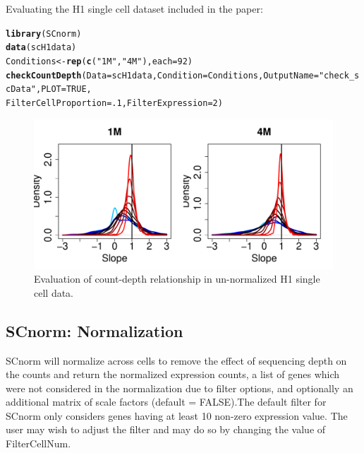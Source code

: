\documentclass{article}\usepackage[]{graphicx}\usepackage[usenames,dvipsnames]{color}
\makeatletter
\newcommand{\hlnum}[1]{\textcolor[rgb]{0.686,0.059,0.569}{#1}}%
\newcommand{\hlstr}[1]{\textcolor[rgb]{0.192,0.494,0.8}{#1}}%
\newcommand{\hlstd}[1]{\textcolor[rgb]{0.345,0.345,0.345}{#1}}%
\newcommand{\hlkwb}[1]{\textcolor[rgb]{0.69,0.353,0.396}{#1}}%
\newcommand{\hlkwc}[1]{\textcolor[rgb]{0.333,0.667,0.333}{#1}}%
\newcommand{\hlkwd}[1]{\textcolor[rgb]{0.737,0.353,0.396}{\textbf{#1}}}%
\newenvironment{kframe}{%
 \def\at@end@of@kframe{}%
 \ifinner\ifhmode%
  \def\at@end@of@kframe{\end{minipage}}%
  \begin{minipage}{\columnwidth}%
 \fi\fi%
 \def\FrameCommand##1{\hskip\@totalleftmargin \hskip-\fboxsep
 \colorbox{shadecolor}{##1}\hskip-\fboxsep
     \hskip-\linewidth \hskip-\@totalleftmargin \hskip\columnwidth}%
 \MakeFramed {\advance\hsize-\width
   \@totalleftmargin\z@ \linewidth\hsize
   \@setminipage}}%
 {\par\unskip\endMakeFramed%
 \at@end@of@kframe}
\newenvironment{knitrout}{}{} %
\makeatother
\begin{document}
Evaluating the H1 single cell dataset included in the paper:
\begin{knitrout}
\color{fgcolor}\begin{kframe}
\begin{alltt}
\hlkwd{library}\hlstd{(SCnorm)}
\hlkwd{data}\hlstd{(scH1data)}
\hlstd{Conditions} \hlkwb{<-} \hlkwd{rep}\hlstd{(}\hlkwd{c}\hlstd{(}\hlstr{"1M"}\hlstd{,} \hlstr{"4M"}\hlstd{),} \hlkwc{each}\hlstd{=}\hlnum{92}\hlstd{)}
\hlkwd{checkCountDepth}\hlstd{(}\hlkwc{Data} \hlstd{= scH1data,} \hlkwc{Condition} \hlstd{= Conditions,} \hlkwc{OutputName} \hlstd{=} \hlstr{"check_scData"}\hlstd{,} \hlkwc{PLOT}\hlstd{=}\hlnum{TRUE}\hlstd{,}
                \hlkwc{FilterCellProportion} \hlstd{=} \hlnum{.1}\hlstd{,} \hlkwc{FilterExpression} \hlstd{=} \hlnum{2}\hlstd{)}
\end{alltt}
\end{kframe}
\end{knitrout}

\begin{figure}[h!]
\centering
\includegraphics[width=.7\textwidth]{check_scData_initial_evaluation}
\caption{Evaluation of count-depth relationship in un-normalized H1 single cell data.}
\end{figure}

\newpage




  \subsection{SCnorm: Normalization}
\label{sec:Normalization}
SCnorm will normalize across cells to remove the effect of sequencing depth on the counts and return the normalized expression counts, a list of genes which were not considered in the normalization due to filter options, and optionally an additional matrix of scale factors (default = FALSE).The default filter for SCnorm only considers genes having at least 10 non-zero expression value. The user may wish to adjust the filter and may do so by changing the value of FilterCellNum.
\end{document}
